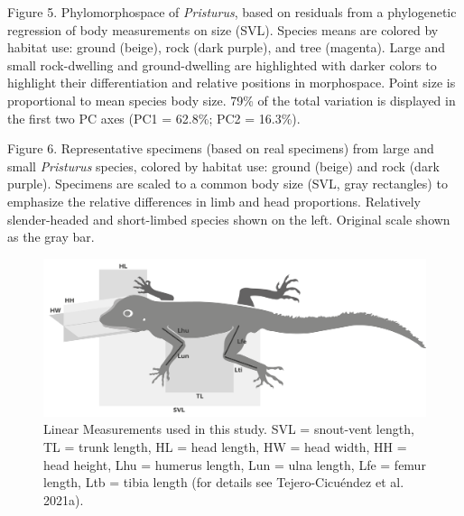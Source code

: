 \documentclass[
  11pt,
]{article}
\begin{document}
Figure 5. Phylomorphospace of \emph{Pristurus}, based on residuals from
a phylogenetic regression of body measurements on size (SVL). Species
means are colored by habitat use: ground (beige), rock (dark purple),
and tree (magenta). Large and small rock-dwelling and ground-dwelling
are highlighted with darker colors to highlight their differentiation
and relative positions in morphospace. Point size is proportional to
mean species body size. 79\% of the total variation is displayed in the
first two PC axes (PC1 = 62.8\%; PC2 = 16.3\%).

Figure 6. Representative specimens (based on real specimens) from large
and small \textit{Pristurus} species, colored by habitat use: ground
(beige) and rock (dark purple). Specimens are scaled to a common body
size (SVL, gray rectangles) to emphasize the relative differences in
limb and head proportions. Relatively slender-headed and short-limbed
species shown on the left. Original scale shown as the gray bar.

\newpage

\begin{figure}

{\centering \includegraphics[width=1\linewidth]{Figs/Fig1} 

}

\caption{Linear Measurements used in this study. SVL = snout-vent length, TL = trunk length, HL = head length, HW = head width, HH = head height, Lhu = humerus length, Lun = ulna length, Lfe = femur length, Ltb = tibia length (for details see Tejero-Cicu{\'{e}}ndez et al. 2021a).}\label{fig:unnamed-chunk-4}
\end{figure}

\newpage
\end{document}
